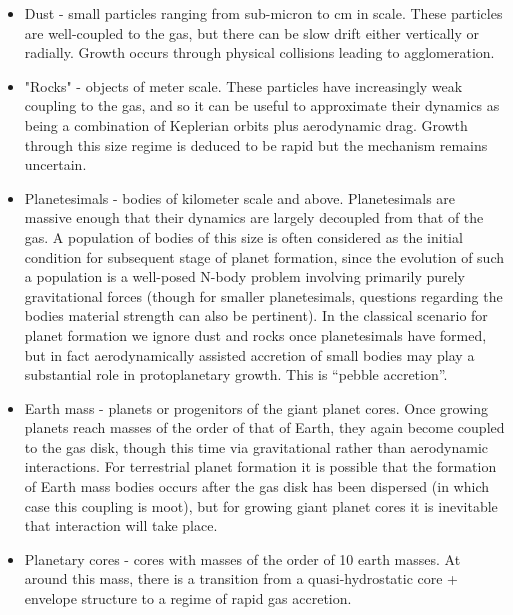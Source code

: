 \documentclass[12pt]{article}
\begin{document}
\begin{itemize}
    \item Dust - small particles ranging from sub-micron to cm in scale. These particles are well-coupled to the gas, but there can be slow drift either vertically or radially. Growth occurs through physical collisions leading to agglomeration.
    \item "Rocks" - objects of meter scale. These particles have increasingly weak coupling to the gas, and so it can be useful to approximate their dynamics as being a combination of Keplerian orbits plus aerodynamic drag. Growth through this size regime is deduced to be rapid but the mechanism remains uncertain.
    \item Planetesimals - bodies of kilometer scale and above. Planetesimals are massive enough that their dynamics are largely decoupled from that of the gas. A population of bodies of this size is often considered as the initial condition for subsequent stage of planet formation, since the evolution of such a population is a well-posed N-body problem involving primarily purely gravitational forces (though for smaller planetesimals, questions regarding the bodies material strength can also be pertinent). In the classical scenario for planet formation we ignore dust and rocks once planetesimals have formed, but in fact aerodynamically assisted accretion of small bodies may play a substantial role in protoplanetary growth. This is “pebble accretion”.
    \item Earth mass - planets or progenitors of the giant planet cores. Once growing planets reach masses of the order of that of Earth, they again become coupled to the gas disk, though this time via gravitational rather than aerodynamic interactions. For terrestrial planet formation it is possible that the formation of Earth mass bodies occurs after the gas disk has been dispersed (in which case this coupling is moot), but for growing giant planet cores it is inevitable that interaction will take place.
    \item Planetary cores - cores with  masses  of  the  order  of 10 earth masses.  At around this mass, there is a transition from a quasi-hydrostatic core + envelope structure to a regime of rapid gas accretion.
\end{itemize}
\end{document}

